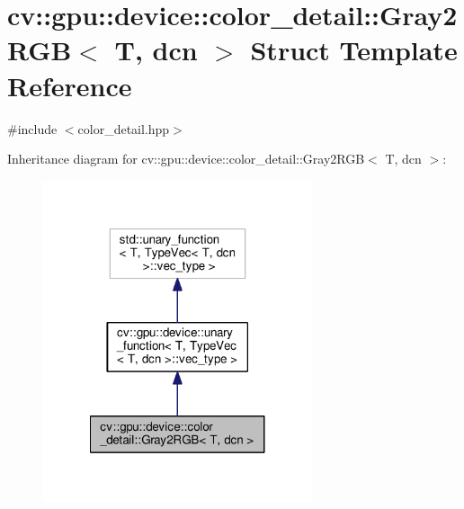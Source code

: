 \hypertarget{structcv_1_1gpu_1_1device_1_1color__detail_1_1Gray2RGB}{\section{cv\-:\-:gpu\-:\-:device\-:\-:color\-\_\-detail\-:\-:Gray2\-R\-G\-B$<$ T, dcn $>$ Struct Template Reference}
\label{structcv_1_1gpu_1_1device_1_1color__detail_1_1Gray2RGB}
}


{\ttfamily \#include $<$color\-\_\-detail.\-hpp$>$}



Inheritance diagram for cv\-:\-:gpu\-:\-:device\-:\-:color\-\_\-detail\-:\-:Gray2\-R\-G\-B$<$ T, dcn $>$\-:\nopagebreak
\begin{figure}[H]
\begin{center}
\leavevmode
\includegraphics[width=224pt]{structcv_1_1gpu_1_1device_1_1color__detail_1_1Gray2RGB__inherit__graph}
\end{center}
\end{figure}


